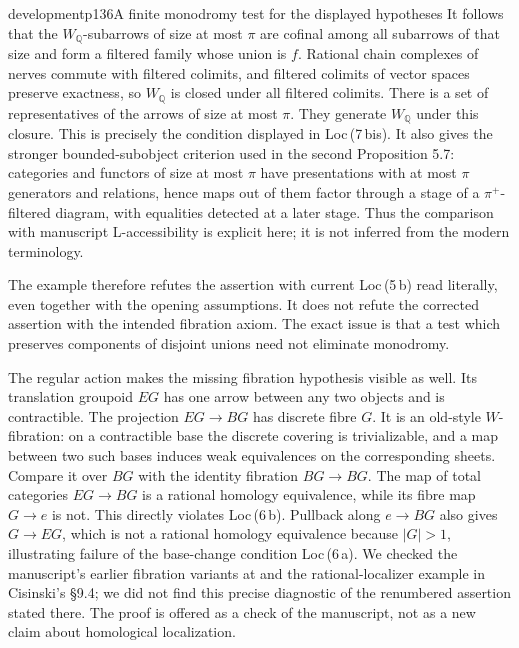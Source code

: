 \begin{dcomment}{development}{p136}{A finite monodromy test for the displayed hypotheses}
It follows that the $W_{\mathbb Q}$-subarrows of size at most $\pi$ are cofinal among all subarrows of that size and form a filtered family whose union is $f$. Rational chain complexes of nerves commute with filtered colimits, and filtered colimits of vector spaces preserve exactness, so $W_{\mathbb Q}$ is closed under all filtered colimits. There is a set of representatives of the arrows of size at most $\pi$. They generate $W_{\mathbb Q}$ under this closure. This is precisely the condition displayed in Loc\,(7\,bis). It also gives the stronger bounded-subobject criterion used in the second Proposition 5.7: categories and functors of size at most $\pi$ have presentations with at most $\pi$ generators and relations, hence maps out of them factor through a stage of a $\pi^+$-filtered diagram, with equalities detected at a later stage. Thus the comparison with manuscript L-accessibility is explicit here; it is not inferred from the modern terminology.

The example therefore refutes the assertion with current Loc\,(5\,b) read literally, even together with the opening assumptions. It does not refute the corrected assertion with the intended fibration axiom. The exact issue is that a test which preserves components of disjoint unions need not eliminate monodromy.

The regular action makes the missing fibration hypothesis visible as well. Its translation groupoid $EG$ has one arrow between any two objects and is contractible. The projection $EG\longrightarrow BG$ has discrete fibre $G$. It is an old-style $W$-fibration: on a contractible base the discrete covering is trivializable, and a map between two such bases induces weak equivalences on the corresponding sheets. Compare it over $BG$ with the identity fibration $BG\longrightarrow BG$. The map of total categories $EG\longrightarrow BG$ is a rational homology equivalence, while its fibre map $G\longrightarrow e$ is not. This directly violates Loc\,(6\,b). Pullback along $e\longrightarrow BG$ also gives $G\longrightarrow EG$, which is not a rational homology equivalence because $|G|>1$, illustrating failure of the base-change condition Loc\,(6\,a). We checked the manuscript's earlier fibration variants at \citet[chapter XII, ms.~53--56]{Grothendieck1990XIIa} and the rational-localizer example in Cisinski's \S9.4; we did not find this precise diagnostic of the renumbered assertion stated there. The proof is offered as a check of the manuscript, not as a new claim about homological localization.
\end{dcomment}


